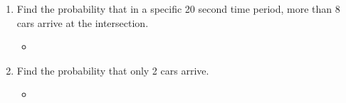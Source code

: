 \documentclass[basic, header]{nosvagor-notes}
\begin{document}
\begin{enumerate}[itemsep=7em]
\begin{enumerate}
      \item Find the probability that in a specific 20 second
        time period, more than 8 cars arrive at the intersection.
        \begin{itemize}
          \item

        \end{itemize}

      \item Find the probability that only 2 cars arrive.
        \begin{itemize}
          \item

        \end{itemize}

    \end{enumerate}


\end{enumerate}
\end{document}
